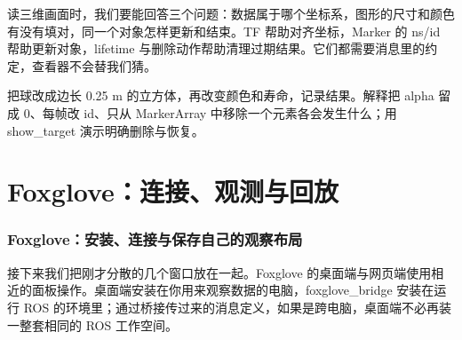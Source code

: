 \begin{conclusion}
读三维画面时，我们要能回答三个问题：数据属于哪个坐标系，图形的尺寸和颜色有没有填对，同一个对象怎样更新和结束。TF 帮助对齐坐标，Marker 的 ns/id 帮助更新对象，lifetime 与删除动作帮助清理过期结果。它们都需要消息里的约定，查看器不会替我们猜。
\end{conclusion}

\begin{exercise}\label{ex:v2-ros-rviz-markers}
把球改成边长 0.25 m 的立方体，再改变颜色和寿命，记录结果。解释把 alpha 留成 0、每帧改 id、只从 MarkerArray 中移除一个元素各会发生什么；用 show\_target 演示明确删除与恢复。
\end{exercise}

\section{Foxglove：连接、观测与回放}
\subsubsection{Foxglove：安装、连接与保存自己的观察布局}
\label{sec:ros2-foxglove}

接下来我们把刚才分散的几个窗口放在一起。Foxglove 的桌面端与网页端使用相近的面板操作。桌面端安装在你用来观察数据的电脑，foxglove\_bridge 安装在运行 ROS 的环境里；通过桥接传过来的消息定义，如果是跨电脑，桌面端不必再装一整套相同的 ROS 工作空间。

